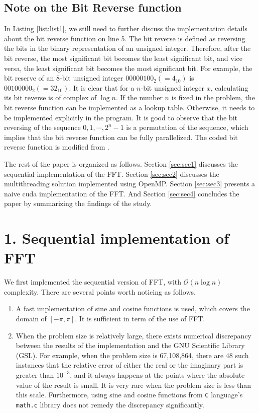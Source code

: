 \documentclass[amsmath,amssymb]{revtex4}
\begin{document}
\subsection{\label{subsec:subsec1.1}Note on the Bit Reverse function}
In Listing \ref{list:list1}, we still need to further discuss the implementation details about the bit reverse function on line 5. The bit reverse is defined as reversing the bits in the binary representation of an unsigned integer. Therefore, after the bit reverse, the most significant bit becomes the least significant bit, and vice versa, the least significant bit becomes the most significant bit. For example, the bit reserve of an 8-bit unsigned integer $00000100_2(=4_{10})$ is $00100000_2(=32_{10})$. It is clear that for a $n$-bit unsigned integer $x$, calculating its bit reverse is of complex of $\log n$. If the number $n$ is fixed in the problem, the bit reverse function can be implemented as a lookup table. Otherwise, it needs to be implemented explicitly in the program. It is good to observe that the bit reversing of the sequence $0, 1, \cdots, 2^n-1$ is a permutation of the sequence, which implies that the bit reverse function can be fully parallelized. The coded bit reverse function is modified from \cite{ref:bitreverse}.

The rest of the paper is organized as follows. Section \ref{sec:sec1} discusses the sequential implementation of the FFT. Section \ref{sec:sec2} discusses the multithreading solution implemented using OpenMP. Section \ref{sec:sec3} presents a naive cuda implementation of the FFT. And Section  \ref{sec:sec4} concludes the paper by summarizing the findings of the study.

\section{\label{sec:sec1}1. Sequential implementation of FFT}
We first implemented the sequential version of FFT, with $\mathcal{O}(n\log n)$ complexity.
There are several points worth noticing as follows.
\begin{enumerate}
\item A fast implementation of sine and cosine functions is used, which covers the domain of $[-\pi, \pi]$. It is sufficient in term of the use of FFT.
\item When the problem size is relatively large, there exists numerical discrepancy between the results of the implementation and the GNU Scientific Library (GSL). For example, when the problem size is 67,108,864, there are 48 such instances that the relative error of either the real or the imaginary part is greater than $10^{-3}$, and it always happens at the points where the absolute value of the result is small. It is very rare when the problem size is less than this scale. Furthermore, using sine and cosine functions from {\tt C} language's {\tt math.c} library does not remedy the discrepancy significantly.
\end{enumerate}
\end{document}
